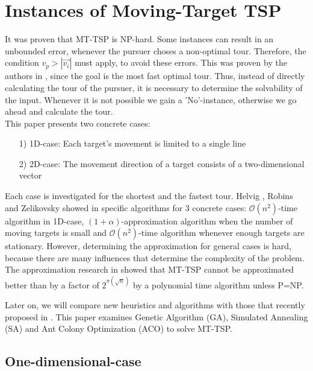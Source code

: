\documentclass{acm_proc_article-sp}
\begin{document}
\section{Instances of Moving-Target TSP}

It was proven that MT-TSP is NP-hard. Some instances can result in an unbounded error, whenever the pursuer choses a non-optimal tour. Therefore, the condition $v_p > |\overrightarrow{v_i}|$ must apply, to avoid these errors. This was proven by the authors in \cite{helvig}, since the goal is the most fast optimal tour.  Thus, instead of directly calculating the tour of the pursuer, it is necessary to determine the solvability of the input. Whenever it is not possible we gain a 'No'-instance, otherwise we go ahead and calculate the tour. \\
This paper presents two concrete cases:
\begin{itemize}
\item[1)]
1D-case: 
Each target's movement is limited to a single line 

\item[2)]
2D-case:
The movement direction of a target consists of a two-dimensional vector 

\end{itemize}

Each case is investigated for the shortest and the fastest tour. Helvig , Robins and Zelikovsky showed in \cite{helvig} specific algorithms for 3 concrete cases: $\mathcal{O}(n^2)$-time algorithm in 1D-case, $(1+\alpha)$-approximation algorithm when the number of moving targets is small and $\mathcal{O}(n^2)$-time algorithm whenever enough targets are stationary. However, determining the approximation for general cases is hard, because there are many influences that determine the complexity of the problem. The approximation research in \cite{hammar} showed that MT-TSP cannot be approximated better than by a factor of $2^{\pi (\sqrt{n})}$ by a polynomial time algorithm unless P=NP.

Later on, we will compare new heuristics and algorithms with those that recently proposed in \cite{moraes}. This paper examines Genetic Algorithm (GA), Simulated Annealing (SA) and Ant Colony Optimization (ACO) to solve MT-TSP.

\subsection{One-dimensional-case}
\end{document}

